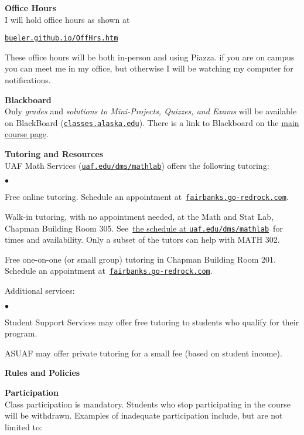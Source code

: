 \documentclass[12pt]{article}
\renewcommand{\emph}[1]{\textsf{\textbf{#1}}}
\newcommand{\localhead}[1]{\par\smallskip\textbf{#1}\nobreak\\}%
\def\heading#1{\localhead{\large\emph{#1}}}
\def\subheading#1{\localhead{\emph{#1}}}
\newenvironment{clist}%
{\bgroup\parskip 0pt\begin{list}{$\bullet$}{\partopsep 4pt\topsep 0pt\itemsep -2pt}}%
{\end{list}\egroup}%
\begin{document}
\heading{Office Hours}
I will hold office hours as shown at

\smallskip
\centerline{\href{http://bueler.github.io/OffHrs.htm}{\tt bueler.github.io/OffHrs.htm}}

These office hours will be both in-person and using Piazza.  if you are on campus you can meet me in my office, but otherwise I will be watching my computer for notifications.


\heading{Blackboard}
Only \textsl{grades} and \textsl{solutions to Mini-Projects, Quizzes, and Exams} will be available on BlackBoard (\href{https://classes.alaska.edu/}{\tt classes.alaska.edu}).  There is a link to Blackboard on the \href{https://bueler.github.io/math302/}{main course page}.


\heading{Tutoring and Resources}
UAF Math Services (\href{http://www.uaf.edu/dms/mathlab/}{\texttt{uaf.edu/dms/mathlab}}) offers the following tutoring:
\begin{clist}
	\item Free online tutoring.  Schedule an appointment at\, \href{https://fairbanks.go-redrock.com/}{\texttt{fairbanks.go-redrock.com}}.
	\item Walk-in tutoring, with no appointment needed, at the Math and Stat Lab, Chapman Building Room 305.  See\, \href{https://uaf.edu/dms/mathlab/math-and-stat-lab-schedul-1/}{the schedule at \texttt{uaf.edu/dms/mathlab}}\, for times and availability.  Only a subset of the tutors can help with MATH 302.
	\item Free one-on-one (or small group) tutoring in Chapman Building Room 201.  Schedule an appointment at\, \href{https://fairbanks.go-redrock.com/}{\texttt{fairbanks.go-redrock.com}}.
\end{clist}

Additional services:
\begin{clist}
	\item Student Support Services may offer free tutoring to students who qualify for their program.
	\item ASUAF may offer private tutoring for a small fee (based on student income).
\end{clist}


\newpage
\strut

\heading{Rules and Policies}
\vskip -20pt
\subheading{Participation}
Class participation is mandatory.  Students who stop participating in the course will be withdrawn.  Examples of inadequate participation include, but are not limited to:
\end{document}

